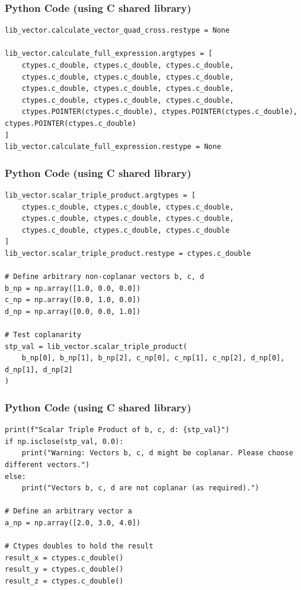 \documentclass{beamer}
\begin{document}
\begin{frame}[fragile]
\frametitle{Python Code (using C shared library)}
\begin{lstlisting}
lib_vector.calculate_vector_quad_cross.restype = None

lib_vector.calculate_full_expression.argtypes = [
    ctypes.c_double, ctypes.c_double, ctypes.c_double,
    ctypes.c_double, ctypes.c_double, ctypes.c_double,
    ctypes.c_double, ctypes.c_double, ctypes.c_double,
    ctypes.c_double, ctypes.c_double, ctypes.c_double,
    ctypes.POINTER(ctypes.c_double), ctypes.POINTER(ctypes.c_double), ctypes.POINTER(ctypes.c_double)
]
lib_vector.calculate_full_expression.restype = None

\end{lstlisting}
\end{frame}

\begin{frame}[fragile]
\frametitle{Python Code (using C shared library)}
\begin{lstlisting}
lib_vector.scalar_triple_product.argtypes = [
    ctypes.c_double, ctypes.c_double, ctypes.c_double,
    ctypes.c_double, ctypes.c_double, ctypes.c_double,
    ctypes.c_double, ctypes.c_double, ctypes.c_double
]
lib_vector.scalar_triple_product.restype = ctypes.c_double

# Define arbitrary non-coplanar vectors b, c, d
b_np = np.array([1.0, 0.0, 0.0])
c_np = np.array([0.0, 1.0, 0.0])
d_np = np.array([0.0, 0.0, 1.0])

# Test coplanarity
stp_val = lib_vector.scalar_triple_product(
    b_np[0], b_np[1], b_np[2], c_np[0], c_np[1], c_np[2], d_np[0], d_np[1], d_np[2]
)
\end{lstlisting}
\end{frame}

\begin{frame}[fragile]
\frametitle{Python Code (using C shared library)}
\begin{lstlisting}
print(f"Scalar Triple Product of b, c, d: {stp_val}")
if np.isclose(stp_val, 0.0):
    print("Warning: Vectors b, c, d might be coplanar. Please choose different vectors.")
else:
    print("Vectors b, c, d are not coplanar (as required).")

# Define an arbitrary vector a
a_np = np.array([2.0, 3.0, 4.0])

# Ctypes doubles to hold the result
result_x = ctypes.c_double()
result_y = ctypes.c_double()
result_z = ctypes.c_double()
\end{lstlisting}
\end{frame}
\end{document}
